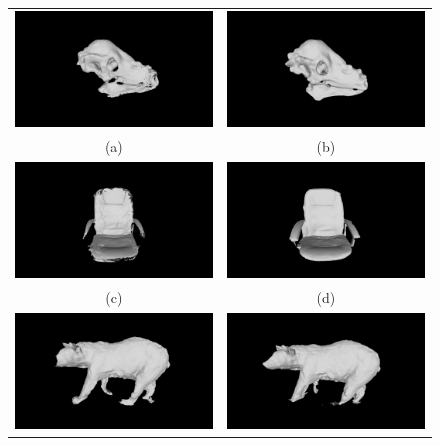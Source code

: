 \begin{figure}[!htbp]
  \centering
  \begin{tabular}{cc}
    \includegraphics[width=.4\linewidth]{figures/object_recon/comp/prob/dino00.png}&
    \includegraphics[width=.4\linewidth]{figures/object_recon/comp/itm/dino00.png}\\
    (a) & (b)\\
		\includegraphics[width=.4\linewidth]{figures/object_recon/comp/prob/chair00.png}&
    \includegraphics[width=.4\linewidth]{figures/object_recon/comp/itm/chair00.png} \\
    (c) & (d) \\
		\includegraphics[width=.4\linewidth]{figures/object_recon/comp/prob/bear00.png}&
    \includegraphics[width=.4\linewidth]{figures/object_recon/comp/itm/bear00.png}\\

\end{tabular}
\end{figure}
